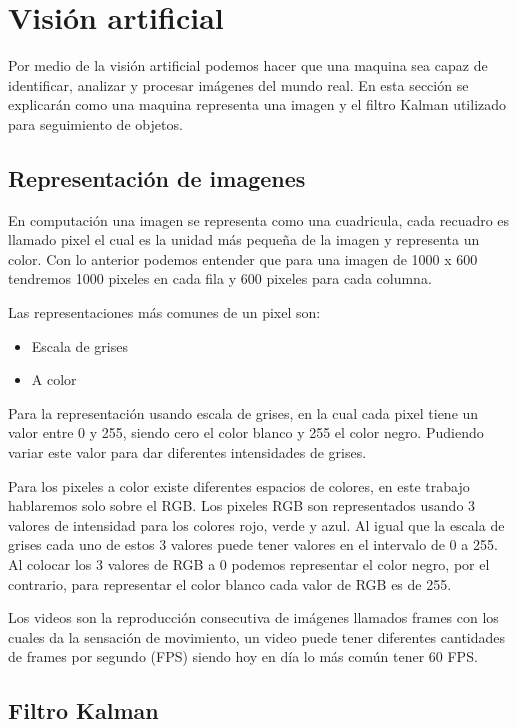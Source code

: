 \section{Visión artificial}

Por medio de la visión artificial podemos hacer que una maquina sea capaz de identificar, analizar y procesar imágenes del mundo real. En esta sección se explicarán como una maquina representa una imagen y el filtro Kalman utilizado para seguimiento de objetos.

\subsection{Representación de imagenes}

En computación una imagen se representa como una cuadricula, cada recuadro es llamado pixel el cual es la unidad más pequeña de la imagen y representa un color. Con lo anterior podemos entender que para una imagen de 1000 x 600 tendremos 1000 pixeles en cada fila y 600 pixeles para cada columna.

Las representaciones más comunes de un pixel son:

\begin{itemize}
\item Escala de grises
\item A color
\end{itemize}


Para la representación usando escala de grises, en la cual cada pixel tiene un valor entre 0 y 255, siendo cero el color blanco y 255 el color negro. Pudiendo variar este valor para dar diferentes intensidades de grises.

Para los pixeles a color existe diferentes espacios de colores, en este trabajo hablaremos solo sobre el RGB. Los pixeles RGB son representados usando 3 valores de intensidad para los colores rojo, verde y azul. Al igual que la escala de grises cada uno de estos 3 valores puede tener valores en el intervalo de 0 a 255. Al colocar los 3 valores de RGB a 0 podemos representar el color negro, por el contrario, para representar el color blanco cada valor de RGB es de 255.

Los videos son la reproducción consecutiva de imágenes llamados frames con los cuales da la sensación de movimiento, un video puede tener diferentes cantidades de frames por segundo (FPS) siendo hoy en día lo más común tener 60 FPS.

\subsection{Filtro Kalman}

